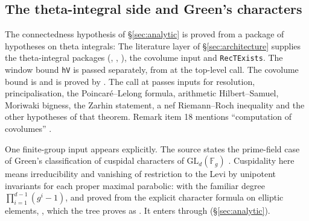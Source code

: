\subsection{The theta-integral side and Green's characters}\label{sec:thetaside}

The connectedness hypothesis  of \S\ref{sec:analytic} is proved from a
package of hypotheses on theta integrals:
\noindent The literature layer of \S\ref{sec:architecture} supplies the theta-integral packages
(,
,
), the
covolume input and \texttt{RecTExists}. The window bound \texttt{hV} is passed separately, from
 at the top-level call. The covolume bound is
\noindent and is proved by 
.
The call at
passes inputs for resolution, principalisation, the Poincaré--Lelong formula, arithmetic
Hilbert--Samuel, Moriwaki bigness, the Zarhin statement, a nef Riemann--Roch inequality and the other
hypotheses of that theorem. Remark item 18
mentions ``computation of covolumes'' .

One finite-group input appears explicitly. The source states the prime-field case of Green's
classification of cuspidal characters of $\mathrm{GL}_d(\mathbb F_g)$ . Cuspidality here
means irreducibility and vanishing of restriction to the Levi by unipotent invariants for each proper
maximal parabolic:
\noindent with the familiar degree $\prod_{i=1}^{d-1}(g^i-1)$, and proved from the explicit character
formula on elliptic elements, 
,
which the tree proves as 
.
It enters through  (\S\ref{sec:analytic}).

